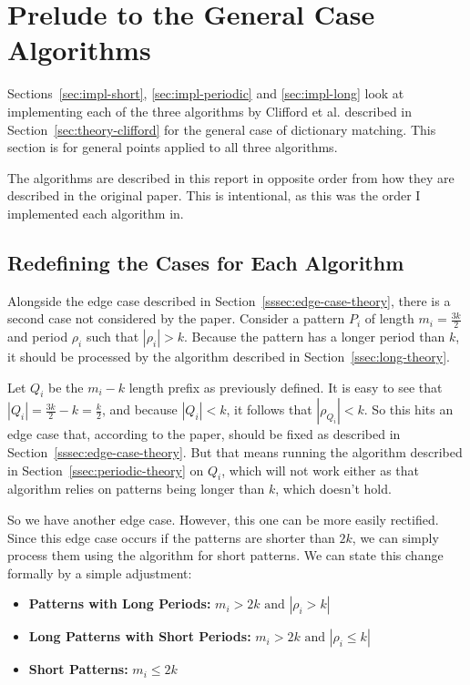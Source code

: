 \documentclass[ %
                    author={Dominic Joseph Moylett},
                    degree={MEng},
                     title={Dictionary Matching with Fingerprints},
                  subtitle={An Empirical Analysis},
                      type={research},
                      year={2015} ]{dissertation}
\begin{document}
\section{Prelude to the General Case Algorithms}

Sections~\ref{sec:impl-short}, \ref{sec:impl-periodic} and \ref{sec:impl-long} look at implementing each of the three algorithms by Clifford et al. described in Section~\ref{sec:theory-clifford} for the general case of dictionary matching. This section is for general points applied to all three algorithms.

The algorithms are described in this report in opposite order from how they are described in the original paper. This is intentional, as this was the order I implemented each algorithm in.

\subsection{Redefining the Cases for Each Algorithm}

Alongside the edge case described in Section~\ref{sssec:edge-case-theory}, there is a second case not considered by the paper. Consider a pattern $P_i$ of length $m_i = \frac{3k}{2}$ and period $\rho_i$ such that $|\rho_i| > k$. Because the pattern has a longer period than $k$, it should be processed by the algorithm described in Section~\ref{ssec:long-theory}.

Let $Q_i$ be the $m_i - k$ length prefix as previously defined. It is easy to see that $|Q_i| = \frac{3k}{2} - k = \frac{k}{2}$, and because $|Q_i| < k$, it follows that $|\rho_{Q_i}| < k$. So this hits an edge case that, according to the paper, should be fixed as described in Section~\ref{sssec:edge-case-theory}. But that means running the algorithm described in Section~\ref{ssec:periodic-theory} on $Q_i$, which will not work either as that algorithm relies on patterns being longer than $k$, which doesn't hold.

So we have another edge case. However, this one can be more easily rectified. Since this edge case occurs if the patterns are shorter than $2k$, we can simply process them using the algorithm for short patterns. We can state this change formally by a simple adjustment:

\begin{itemize}
  \item \textbf{Patterns with Long Periods:} $m_i > 2k \text{ and } |\rho_i > k|$
  \item \textbf{Long Patterns with Short Periods:} $m_i > 2k \text{ and } |\rho_i \leq k|$
  \item \textbf{Short Patterns:} $m_i \leq 2k$
\end{itemize}
\end{document}
